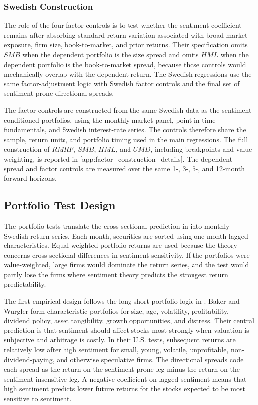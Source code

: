 \documentclass[11pt]{article}
\newcommand{\var}[1]{\ensuremath{#1}}
\begin{document}
\subsubsection{Swedish Construction}
The role of the four factor controls is to test whether the sentiment coefficient remains after absorbing standard return variation associated with broad market exposure, firm size, book-to-market, and prior returns. Their specification omits \var{SMB} when the dependent portfolio is the size spread and omits \var{HML} when the dependent portfolio is the book-to-market spread, because those controls would mechanically overlap with the dependent return. The Swedish regressions use the same factor-adjustment logic with Swedish factor controls and the final set of sentiment-prone directional spreads.

The factor controls are constructed from the same Swedish data as the sentiment-conditioned portfolios, using the monthly market panel, point-in-time fundamentals, and Swedish interest-rate series. The controls therefore share the sample, return units, and portfolio timing used in the main regressions. The full construction of \var{RMRF}, \var{SMB}, \var{HML}, and \var{UMD}, including breakpoints and value-weighting, is reported in \cref{app:factor_construction_details}. The dependent spread and factor controls are measured over the same 1-, 3-, 6-, and 12-month forward horizons.

\subsection{Portfolio Test Design}
The portfolio tests translate the cross-sectional prediction in \citet{baker2006sentiment} into monthly Swedish return series. Each month, securities are sorted using one-month lagged characteristics. Equal-weighted portfolio returns are used because the theory concerns cross-sectional differences in sentiment sensitivity. If the portfolios were value-weighted, large firms would dominate the return series, and the test would partly lose the firms where sentiment theory predicts the strongest return predictability.

The first empirical design follows the long-short portfolio logic in \citet{baker2006sentiment}. Baker and Wurgler form characteristic portfolios for size, age, volatility, profitability, dividend policy, asset tangibility, growth opportunities, and distress. Their central prediction is that sentiment should affect stocks most strongly when valuation is subjective and arbitrage is costly. In their U.S. tests, subsequent returns are relatively low after high sentiment for small, young, volatile, unprofitable, non-dividend-paying, and otherwise speculative firms. The directional spreads code each spread as the return on the sentiment-prone leg minus the return on the sentiment-insensitive leg. A negative coefficient on lagged sentiment means that high sentiment predicts lower future returns for the stocks expected to be most sensitive to sentiment.
\end{document}
